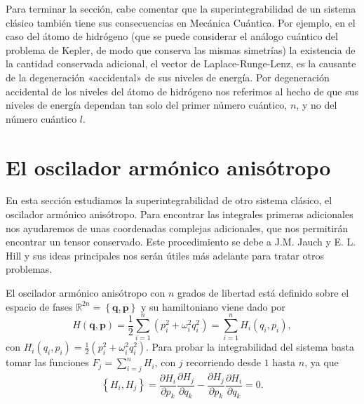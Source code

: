 \documentclass[12pt,a4paper,twoside]{article}
\theoremstyle{definition} \newtheorem{defn}[thm]{Definición}
\theoremstyle{definition} \newtheorem{ejemplo}[thm]{Ejemplo}
\theoremstyle{definition} \newtheorem{ejercicio}[thm]{Ejercicio}
\theoremstyle{remark} \newtheorem*{obs}{Observación}
\def\RR{\mathbb{R}}
\newcommand{\vect}[1]{\mathbf{#1}}
\newcommand{\parcial}[2]{\frac{\partial #1}{\partial #2}}
\begin{document}
Para terminar la sección, cabe comentar que la superintegrabilidad de un sistema clásico también tiene sus consecuencias en Mecánica Cuántica. Por ejemplo, en el caso del átomo de hidrógeno (que se puede considerar el análogo cuántico del problema de Kepler, de modo que conserva las mismas simetrías) la existencia de la cantidad conservada adicional, el vector de Laplace-Runge-Lenz, es la causante de la degeneración «accidental» de sus niveles de energía. Por degeneración accidental de los niveles del átomo de hidrógeno nos referimos al hecho de que sus niveles de energía dependan tan solo del primer número cuántico, $n$, y no del número cuántico $l$.

\section{El oscilador armónico anisótropo}
En esta sección estudiamos la superintegrabilidad de otro sistema clásico, el oscilador armónico anisótropo. Para encontrar las integrales primeras adicionales nos ayudaremos de unas coordenadas complejas adicionales, que nos permitirán encontrar un tensor conservado. Este procedimiento se debe a J.M. Jauch y E. L. Hill \cite{jauchhill} y sus ideas principales nos serán útiles más adelante para tratar otros problemas.

El oscilador armónico anisótropo con $n$ grados de libertad está definido sobre el espacio de fases $\RR^{2n}=\left\{ \vect{q},\vect{p} \right\}$ y su hamiltoniano viene dado por
\begin{equation}
  H(\vect{q},\vect{p})=\frac{1}{2}\sum_{i=1}^n \left(p_i^2 + \omega_i^2q_i^2\right)=\sum_{i=1}^n H_i(q_i,p_i),
  \label{eq:anisotropo}
\end{equation}
con $H_i(q_i,p_i)=\frac{1}{2}(p_i^2+\omega_i^2q_i^2)$. Para probar la integrabilidad del sistema basta tomar las funciones $F_j=\sum_{i=j}^n H_i$, con $j$ recorriendo desde $1$ hasta $n$, ya que
\begin{equation*}
  \left\{ H_i,H_j \right\}=\parcial{H_i}{p_k}\parcial{H_j}{q_k}-\parcial{H_j}{p_k}\parcial{H_i}{q_k}=0.
\end{equation*}
\end{document}
